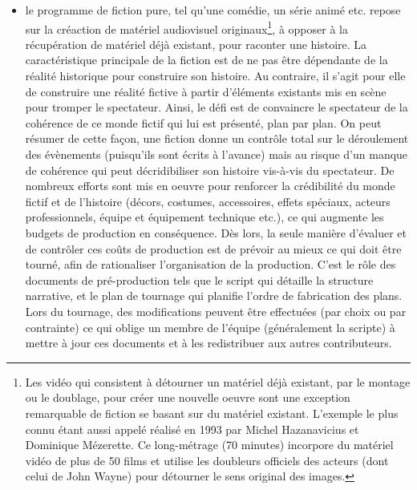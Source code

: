 \begin{itemize}
	\item le programme de fiction pure, tel qu'une comédie, un série animé etc. repose sur la créaction de matériel audiovisuel originaux\footnote{Les  vidéo qui consistent à détourner un matériel déjà existant, par le montage ou le doublage, pour créer une nouvelle oeuvre sont une exception remarquable de fiction se basant sur du matériel existant.
	L'exemple le plus connu étant  aussi appelé  réalisé en 1993 par Michel Hazanavicius et Dominique Mézerette. 
	Ce long-métrage (70 minutes) incorpore du matériel vidéo de plus de 50 films et utilise les doubleurs officiels des acteurs (dont celui de John Wayne) pour détourner le sens original des images.}, à opposer à la récupération de matériel déjà existant, pour raconter une histoire.
	La caractéristique principale de la fiction est de ne pas être dépendante de la réalité historique pour construire son histoire.
	Au contraire, il s'agit pour elle de construire une réalité fictive à partir d'éléments existants mis en scène pour tromper le spectateur.
	Ainsi, le défi est de convaincre le spectateur de la cohérence de ce monde fictif qui lui est présenté, plan par plan. 
	On peut résumer de cette façon, une fiction donne un contrôle total sur le déroulement des évènements (puisqu'ils sont écrits à l'avance) mais au risque d'un manque de cohérence qui peut décridibiliser son histoire vis-à-vis du spectateur.
	De nombreux efforts sont mis en oeuvre pour renforcer la crédibilité du monde fictif et de l'histoire (décors, costumes, accessoires, effets spéciaux, acteurs professionnels, équipe et équipement technique etc.), ce qui augmente les budgets de production en conséquence. 
	Dès lors, la seule manière d'évaluer et de contrôler ces coûts de production est de prévoir au mieux ce qui doit être tourné, afin de rationaliser l'organisation de la production.
	C'est le rôle des documents de pré-production tels que le script qui détaille la structure narrative, et le plan de tournage qui planifie l'ordre de fabrication des plans.
	Lors du tournage, des modifications peuvent être effectuées (par choix ou par contrainte) ce qui oblige un membre de l'équipe (généralement la scripte) à mettre à jour ces documents et à les redistribuer aux autres contributeurs.



\end{itemize}
